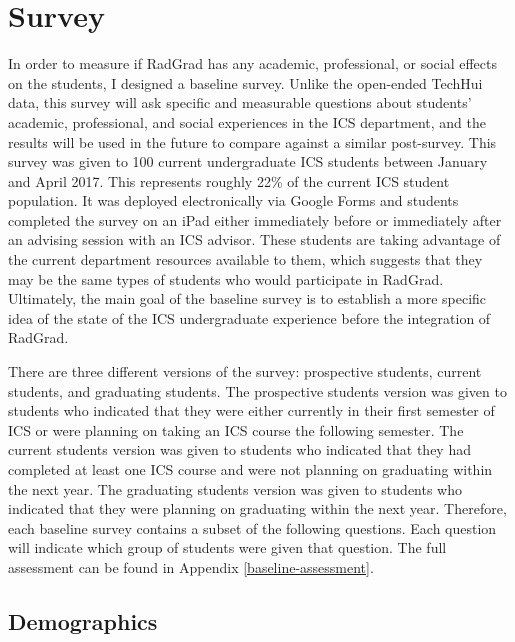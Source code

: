 \chapter{Survey}
\label{survey}

In order to measure if RadGrad has any academic, professional, or social effects on the students, I designed a baseline survey. Unlike the open-ended TechHui data, this survey will ask specific and measurable questions about students' academic, professional, and social experiences in the ICS department, and the results will be used in the future to compare against a similar post-survey. This survey was given to 100 current undergraduate ICS students between January and April 2017. This represents roughly 22\% of the current ICS student population. It was deployed electronically via Google Forms and students completed the survey on an iPad either immediately before or immediately after an advising session with an ICS advisor.  These students are taking advantage of the current department resources available to them, which suggests that they may be the same types of students who would participate in RadGrad. Ultimately, the main goal of the baseline survey is to establish a more specific idea of the state of the ICS undergraduate experience before the integration of RadGrad.

There are three different versions of the survey: prospective students, current students, and graduating students. The prospective students version was given to students who indicated that they were either currently in their first semester of ICS or were planning on taking an ICS course the following semester. The current students version was given to students who indicated that they had completed at least one ICS course and were not planning on graduating within the next year. The graduating students version was given to students who indicated that they were planning on graduating within the next year. Therefore, each baseline survey contains a subset of the following questions. Each question will indicate which group of students were given that question. The full assessment can be found in Appendix \ref{baseline-assessment}. 
\vspace{5mm}
\section{Demographics}

